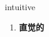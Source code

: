 
\begin{frame}
{\huge intuitive}
\begin{center}
\begin{enumerate}\Large
  \item \textbf{直觉的}
\end{enumerate}
\end{center}
\end{frame}
